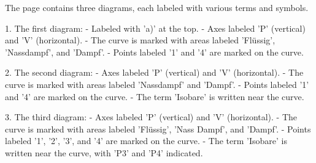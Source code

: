 The page contains three diagrams, each labeled with various terms and symbols. 

1. The first diagram:
   - Labeled with 'a)' at the top.
   - Axes labeled 'P' (vertical) and 'V' (horizontal).
   - The curve is marked with areas labeled 'Flüssig', 'Nassdampf', and 'Dampf'.
   - Points labeled '1' and '4' are marked on the curve.

2. The second diagram:
   - Axes labeled 'P' (vertical) and 'V' (horizontal).
   - The curve is marked with areas labeled 'Nassdampf' and 'Dampf'.
   - Points labeled '1' and '4' are marked on the curve.
   - The term 'Isobare' is written near the curve.

3. The third diagram:
   - Axes labeled 'P' (vertical) and 'V' (horizontal).
   - The curve is marked with areas labeled 'Flüssig', 'Nass Dampf', and 'Dampf'.
   - Points labeled '1', '2', '3', and '4' are marked on the curve.
   - The term 'Isobare' is written near the curve, with 'P3' and 'P4' indicated.